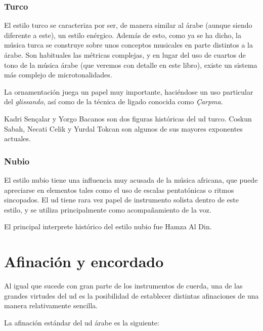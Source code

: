 
\subsubsection{Turco}

El estilo turco se caracteriza por ser, de manera similar al árabe (aunque siendo diferente a este), un estilo enérgico. Además de esto, como ya se ha dicho, la música turca se construye sobre unos conceptos musicales en parte distintos a la árabe. Son habituales las métricas complejas, y en lugar del uso de cuartos de tono de la música árabe (que veremos con detalle en este libro), existe un sistema más complejo de microtonalidades.

La ornamentación juega un papel muy importante, haciéndose un uso particular del \emph{glissando}, así como de la técnica de ligado conocida como \emph{Çarpma}.

Kadri Sençalar y Yorgo Bacanos son dos figuras históricas del ud turco. Coskun Sabah, Necati Celik y Yurdal Tokcan son algunos de sus mayores exponentes actuales.


\subsubsection{Nubio}

El estilo nubio tiene una influencia muy acusada de la música africana, que puede apreciarse en elementos tales como el uso de escalas pentatónicas o ritmos sincopados. El ud tiene rara vez papel de instrumento solista dentro de este estilo, y se utiliza principalmente como acompañamiento de la voz.

El principal interprete histórico del estilo nubio fue Hamza Al Din.


\section{Afinación y encordado}

Al igual que sucede con gran parte de los instrumentos de cuerda, una de las grandes virtudes del ud es la posibilidad de establecer distintas afinaciones de una manera relativamente sencilla.

La afinación estándar del ud árabe es la siguiente:

